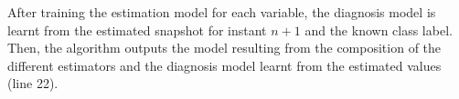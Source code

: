 After training the estimation model for each variable, the diagnosis model is learnt from the estimated snapshot for instant
 $n+1$ and the known class label. Then, the algorithm outputs the model resulting from the composition of the different
 estimators and the diagnosis model learnt from the estimated values (line 22).


\cleardoublepage